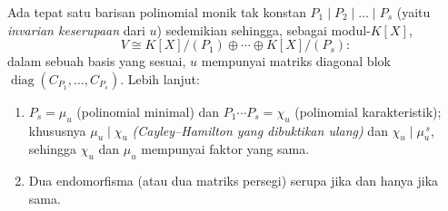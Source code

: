 \begin{theorem}
\label{thm:b3:modules:frobenius}
Ada tepat satu barisan polinomial monik tak konstan $P_1
\mid P_2 \mid \dots \mid P_s$ (yaitu \emph{invarian
keserupaan} dari $u$) sedemikian sehingga, sebagai
modul-$K[X]$,
\[
V \cong K[X]/(P_1) \oplus \cdots \oplus K[X]/(P_s):
\]
dalam sebuah basis yang sesuai, $u$ mempunyai matriks diagonal blok
$\operatorname{diag}(C_{P_1}, \dots, C_{P_s})$. Lebih lanjut:
\begin{enumerate}
  \item $P_s = \mu_u$ (polinomial minimal) dan $P_1\cdots P_s =
        \chi_u$ (polinomial karakteristik); khususnya $\mu_u
        \mid \chi_u$ \emph{(Cayley--Hamilton yang dibuktikan ulang)} dan
        $\chi_u \mid \mu_u^{\,s}$, sehingga $\chi_u$ dan $\mu_u$ mempunyai
        faktor  yang sama.
  \item Dua endomorfisma (atau dua matriks persegi) serupa jika dan hanya jika
         sama.
\end{enumerate}
\end{theorem}


